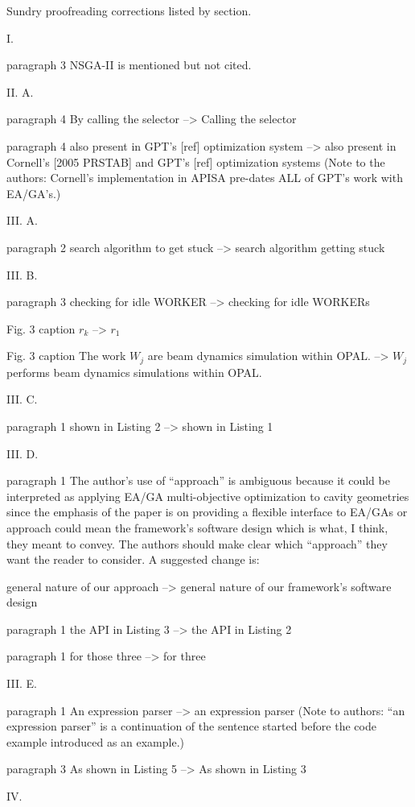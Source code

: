 \documentclass{article}
\begin{document}
Sundry proofreading corrections listed by section.

I.

paragraph 3
NSGA-II is mentioned but not cited.

II. A.

paragraph 4
By calling the selector --> Calling the selector

paragraph 4
also present in GPT's [ref] optimization system --> also
present in Cornell's [2005 PRSTAB] and GPT's [ref] optimization systems
(Note to the authors: Cornell's implementation in APISA pre-dates ALL
of GPT's work with EA/GA's.)

III. A.

paragraph 2
search algorithm to get stuck --> search algorithm getting
stuck

III. B.

paragraph 3
checking for idle WORKER --> checking for idle WORKERs

Fig. 3 caption
$r_k$ --> $r_1$

Fig. 3 caption
The work $W_j$ are beam dynamics simulation within OPAL.
--> $W_j$ performs beam dynamics simulations within OPAL.

III. C.

paragraph 1
shown in Listing 2 --> shown in Listing 1

III. D.

paragraph 1
The author's use of ``approach'' is ambiguous because it could be
interpreted as applying EA/GA multi-objective optimization to cavity
geometries since the emphasis of the paper is on providing a flexible
interface to EA/GAs or approach could mean the framework's software
design which is what, I think, they meant to convey. The authors
should make clear which ``approach'' they want the reader to consider.
A suggested change is:

general nature of our approach --> general nature of our
framework's software design

paragraph 1
the API in Listing 3 --> the API in Listing 2

paragraph 1
for those three --> for three

III. E.

paragraph 1
An expression parser --> an expression parser
(Note to authors: ``an expression parser'' is a continuation of the
sentence started before the code example introduced as an example.)

paragraph 3
As shown in Listing 5 --> As shown in Listing 3

IV.
\end{document}

